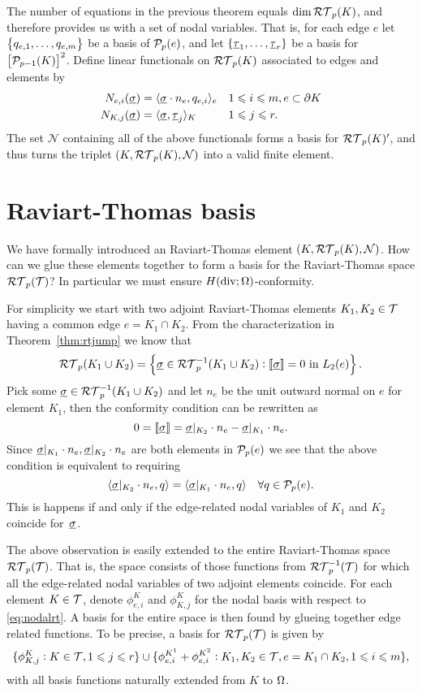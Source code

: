 \documentclass[thesis.tex]{subfiles}
\begin{document}
The number of equations in the previous theorem equals $\dim{\RT_p(K)}$, and therefore provides us with a
set of nodal variables. That is, for each edge $e$ let $\set{q_{e,1},\dots, q_{e,m}}$ be a basis of $\P_p(e)$, and let
 $\set{\vtau_1, \dots, \vtau_r}$ be a  basis for $\left[\P_{p-1}(K)\right]^2$. 
 Define linear functionals on $\RT_p(K)$ associated to edges and elements by
\begin{equation}
  \label{eq:nodalrt}
  \begin{alignedat}{2}
    N_{e,i}(\vsig) &= \ip{\vsig \cdot n_e, q_{e,i}}_e && \quad 1 \leq i \leq m,  e \subset \partial K\\
    N_{K,j}(\vsig) &= \ip{\vsig, \vtau_j}_K &&\quad 1 \leq j \leq r.
  \end{alignedat}
\end{equation}
The set $\mathcal{N}$ containing all of the above functionals forms a basis for $\RT_p(K)'$, and thus
turns the triplet $(K, \RT_p(K), \mathcal{N})$ into a valid finite element.

\section{Raviart-Thomas basis}
We have formally introduced an Raviart-Thomas element $(K, \RT_p(K), \mathcal{N})$. How can we glue these elements
together to form a basis for the Raviart-Thomas space $\RT_p(\T)$? In particular we must ensure $H(\div; \O)$-conformity.

For simplicity we start with two adjoint Raviart-Thomas elements $K_1, K_2 \in  \T$ having a common edge $e = K_1 \cap K_2$.
From the characterization in Theorem~\ref{thm:rtjump} we know that
\[
\RT_p(K_1 \cup K_2) = \set{\vsig \in \RT_p^{-1}(K_1 \cup K_2) : \llbracket \vsig \rrbracket = 0 \text{ in } L_2(e)}.
\]
Pick some $\vsig \in \RT_p^{-1}(K_1 \cup K_2)$ and let $n_e$ be the unit outward normal on $e$ for element $K_1$,
then the conformity condition can be rewritten as
\[
  0 = \llbracket \vsig \rrbracket  = \vsig|_{K_2} \cdot  n_e - \vsig|_{K_1} \cdot n_e.
\]
Since $\vsig|_{K_1} \cdot n_{e}, \vsig|_{K_2} \cdot n_{e}$ are both elements in $\P_p(e)$ we see that 
the  above condition is equivalent to requiring
\[
  \ip{\vsig|_{K_2} \cdot n_e, q} = \ip{\vsig|_{K_1} \cdot n_e, q} \quad \forall q \in \P_p(e).
\]
This is happens if and only if the edge-related nodal variables of $K_1$ and $K_2$ coincide for~$\vsig$.

The above observation is easily extended to the entire Raviart-Thomas space $\RT_p( \T)$.
That is, the space consists of those functions from $\RT_p^{-1}( \T)$ for which all the edge-related
nodal variables of two adjoint elements coincide. For each element $K \in  \T$, denote $\phi^K_{e,i}$ and $\phi^K_{K,j}$
for the nodal basis with respect to \eqref{eq:nodalrt}. A basis for the entire space is then found by
glueing together edge related functions. To be precise, a basis for $\RT_p( \T)$ is given by
\begin{equation}
  \label{eq:basisrt}
  \{\phi^K_{K, j} : K \in  \T, 1 \leq j \leq r\} \cup \{\phi^{K^1}_{e,i} + \phi^{K^2}_{e,i}: K_1, K_2 \in  \T, e = K_1 \cap K_2, 1 \leq i \leq m\},
\end{equation}
with all basis functions naturally extended from $K$ to $\O$.
\end{document}
